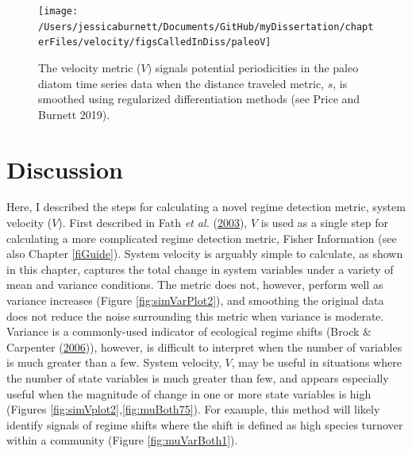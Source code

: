 \documentclass[12pt,twoside,openany]{reedthesis}
\begin{document}
\begin{figure}[bth]

{\centering \texttt{[image: /Users/jessicaburnett/Documents/GitHub/myDissertation/chapterFiles/velocity/figsCalledInDiss/paleoV]} 

}

\caption{The velocity metric  ($V$) signals potential periodicities in the paleo diatom time series data when the distance traveled metric, $s$, is smoothed using regularized differentiation methods (see Price and Burnett 2019).}\label{fig:paleoV}
\end{figure}
\hypertarget{discussion-3}{%
\section{Discussion}\label{discussion-3}}

Here, I described the steps for calculating a novel regime detection metric, system velocity (\(V\)). First described in Fath \emph{et al.} (\protect\hyperlink{ref-fath_regime_2003}{2003}), \(V\) is used as a single step for calculating a more complicated regime detection metric, Fisher Information (see also Chapter \ref{fiGuide}). System velocity is arguably simple to calculate, as shown in this chapter, captures the total change in system variables under a variety of mean and variance conditions. The metric does not, however, perform well as variance increases (Figure \ref{fig:simVarPlot2}), and smoothing the original data does not reduce the noise surrounding this metric when variance is moderate. Variance is a commonly-used indicator of ecological regime shifts (Brock \& Carpenter (\protect\hyperlink{ref-brock_variance_2006}{2006})), however, is difficult to interpret when the number of variables is much greater than a few. System velocity, \(V\), may be useful in situations where the number of state variables is much greater than few, and appears especially useful when the magnitude of change in one or more state variables is high (Figures \ref{fig:simVplot2},\ref{fig:muBoth75}). For example, this method will likely identify signals of regime shifts where the shift is defined as high species turnover within a community (Figure \ref{fig:muVarBoth1}).
\end{document}
